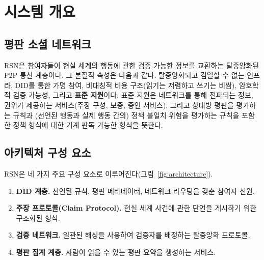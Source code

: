 \documentclass[11pt,a4paper,twocolumn]{article}
\begin{document}
\section{시스템 개요}

\subsection{평판 소셜 네트워크}

RSN은 참여자들이 현실 세계의 행동에 관한 검증 가능한 정보를 교환하는 탈중앙화된 P2P 통신 계층이다. 그 본질적 속성은 다음과 같다. 탈중앙화되고 검열할 수 없는 인프라, DID를 통한 가명 참여, 비대칭적 비용 구조(읽기는 저렴하고 쓰기는 비쌈), 암호학적 검증 가능성, 그리고 \textbf{표준 지원}이다. 표준 지원은 네트워크를 통해 전파되는 정보, 권위가 제공하는 서비스(주장 구성, 보증, 증인 서비스), 그리고 상대방 평판을 평가하는 규칙과 (선언된 행동과 실제 행동 간의) 정책 불일치 위험을 평가하는 규칙을 포함한 정책 형식에 대한 기계 판독 가능한 형식을 뜻한다.

\subsection{아키텍처 구성 요소}

RSN은 네 가지 주요 구성 요소로 이루어진다(그림~\ref{fig:architecture}).
\begin{enumerate}[nosep]
\item \textbf{DID 계층.} 선언된 규칙, 평판 메타데이터, 네트워크 라우팅을 갖춘 참여자 신원.
\item \textbf{주장 프로토콜(Claim Protocol).} 현실 세계 사건에 관한 단언을 게시하기 위한 구조화된 형식.
\item \textbf{검증 네트워크.} 일관된 해싱을 사용하여 검증자를 배정하는 탈중앙화 프로토콜.
\item \textbf{평판 집계 계층.} 사람이 읽을 수 있는 평판 요약을 생성하는 서비스.
\end{enumerate}
\end{document}
